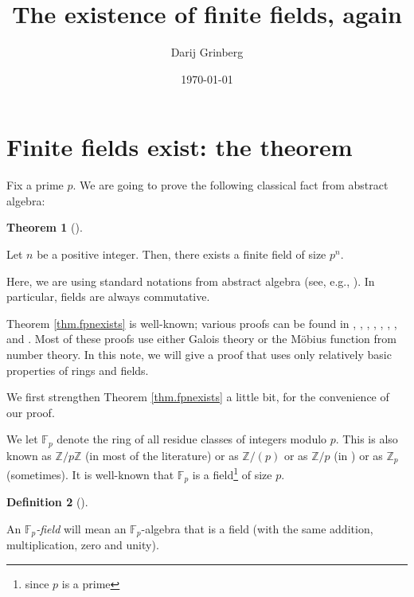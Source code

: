 \documentclass[numbers=enddot,12pt,final,onecolumn,notitlepage]{scrartcl}%
\theoremstyle{definition}
\newtheorem{theo}{Theorem}[subsection]
\newenvironment{theorem}[1][]
{\begin{theo}[#1]\begin{leftbar}}
{\end{leftbar}\end{theo}}
\newtheorem{defi}[theo]{Definition}
\newenvironment{definition}[1][]
{\begin{defi}[#1]\begin{leftbar}}
{\end{leftbar}\end{defi}}
\begin{document}
\title{The existence of finite fields, again}
\author{Darij Grinberg}
\date{
\today
}
\maketitle
\tableofcontents

\section{Finite fields exist: the theorem}

Fix a prime $p$. We are going to prove the following classical fact from
abstract algebra:

\begin{theorem}
\label{thm.fpnexists}Let $n$ be a positive integer. Then, there exists a
finite field of size $p^{n}$.
\end{theorem}

Here, we are using standard notations from abstract algebra (see, e.g.,
\cite{19s}). In particular, fields are always commutative.

Theorem \ref{thm.fpnexists} is well-known; various proofs can be found in
\cite[Theorem 2.5]{LidNie97}, \cite[Theorem 9.14]{Knapp1}, \cite[Exercise
12.126]{Loehr-BC}, \cite[Theorem 2.2]{Conrad-FF}, \cite[Corollary
11.26]{Hungerford}, \cite[Chapter V, Proposition 5.6]{Hungerford-03},
\cite[Theorem 19.3]{Stewar15}, \cite[14.5.1]{Escofi01} and \cite[Theorem
6.2.11]{Walker87}. Most of these proofs use either Galois theory or the
M\"{o}bius function from number theory. In this note, we will give a proof
that uses only relatively basic properties of rings and fields.

We first strengthen Theorem \ref{thm.fpnexists} a little bit, for the
convenience of our proof.

We let $\mathbb{F}_{p}$ denote the ring of all residue classes of integers
modulo $p$. This is also known as $\mathbb{Z}/p\mathbb{Z}$ (in most of the
literature) or as $\mathbb{Z}/\left(  p\right)  $ or as $\mathbb{Z}/p$ (in
\cite{19s}) or as $\mathbb{Z}_{p}$ (sometimes). It is well-known that
$\mathbb{F}_{p}$ is a field\footnote{since $p$ is a prime} of size $p$.

\begin{definition}
An $\mathbb{F}_{p}$\textit{-field} will mean an $\mathbb{F}_{p}$-algebra that
is a field (with the same addition, multiplication, zero and unity).
\end{definition}
\end{document}

